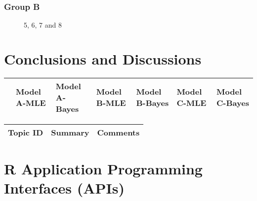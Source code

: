\subsubsection{Group B}

\begin{figure}[H]
	\centering
	\begin{minipage}[b]{0.5\linewidth}
	\end{minipage}\hfill
	\begin{minipage}[b]{0.5\linewidth}
	\end{minipage}\hfill	
	\begin{minipage}[b]{0.5\linewidth}
	\end{minipage}\hfill
	\begin{minipage}[b]{0.5\linewidth}
	\end{minipage}\hfill
	\caption{5, 6, 7 and 8}
	\label{fig:Figure1}
\end{figure} 


\section{Conclusions and Discussions}

\begin{table}[H]
	\centering
	\begin{tabular}{rp{1cm}p{1cm}p{1cm}p{1cm}p{1cm}p{1cm}}
		\hline
		& Model A-MLE & Model A-Bayes & Model B-MLE & Model B-Bayes & Model C-MLE & Model C-Bayes \\ 
		\hline
		\hline
	\end{tabular}
\end{table}

\begin{table}[H]\centering
	\begin{tabular}{p{1cm}p{4cm}p{3cm}}
		Topic ID & Summary & Comments\\
		\hline
		\hline
	\end{tabular}
\end{table}


\section{R Application Programming Interfaces (APIs)}


